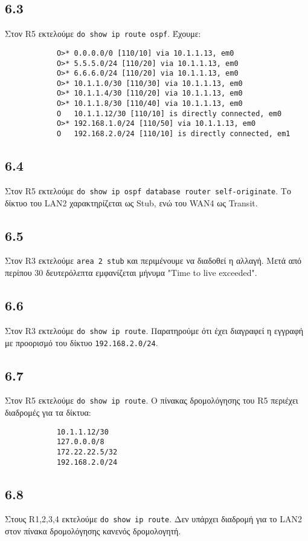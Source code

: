\documentclass[a4paper, 12pt]{article}
\begin{document}
	\subsection*{6.3}
		Στον R5 εκτελούμε \verb|do show ip route ospf|. Έχουμε:
		
		\begin{verbatim}
			O>* 0.0.0.0/0 [110/10] via 10.1.1.13, em0
			O>* 5.5.5.0/24 [110/20] via 10.1.1.13, em0
			O>* 6.6.6.0/24 [110/20] via 10.1.1.13, em0
			O>* 10.1.1.0/30 [110/30] via 10.1.1.13, em0
			O>* 10.1.1.4/30 [110/20] via 10.1.1.13, em0
			O>* 10.1.1.8/30 [110/40] via 10.1.1.13, em0
			O   10.1.1.12/30 [110/10] is directly connected, em0
			O>* 192.168.1.0/24 [110/50] via 10.1.1.13, em0
			O   192.168.2.0/24 [110/10] is directly connected, em1
		\end{verbatim}

	\subsection*{6.4}
		Στον R5 εκτελούμε \verb|do show ip ospf database router self-originate|. Το δίκτυο του LAN2 χαρακτηρίζεται ως Stub, ενώ του WAN4 ως Transit.

	\subsection*{6.5}
		Στον R3 εκτελούμε \verb|area 2 stub| και περιμένουμε να διαδοθεί η αλλαγή. Μετά από περίπου 30 δευτερόλεπτα εμφανίζεται μήνυμα "Time to live exceeded".

	\subsection*{6.6}
		Στον R3 εκτελούμε \verb|do show ip route|. Παρατηρούμε ότι έχει διαγραφεί η εγγραφή με προορισμό του δίκτυο \verb|192.168.2.0/24|.

	\subsection*{6.7}
		Στον R5 εκτελούμε \verb|do show ip route|. Ο πίνακας δρομολόγησης του R5 περιέχει διαδρομές για τα δίκτυα:
		
		\begin{verbatim}
			10.1.1.12/30
			127.0.0.0/8
			172.22.22.5/32
			192.168.2.0/24
		\end{verbatim}

	\subsection*{6.8}
		Στους R1,2,3,4 εκτελούμε \verb|do show ip route|. Δεν υπάρχει διαδρομή για το LAN2 στον πίνακα δρομολόγησης κανενός δρομολογητή.
\end{document}

